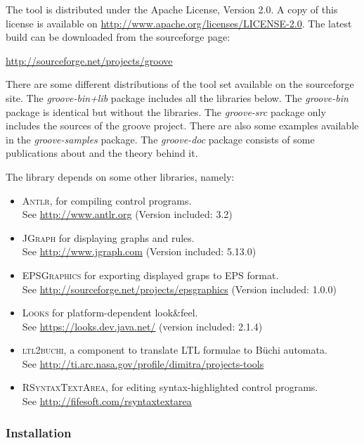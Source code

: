 The \GROOVE tool is distributed under the Apache License, Version 2.0. A copy of
this license is available on \url{http://www.apache.org/licenses/LICENSE-2.0}.
The latest \GROOVE build can be downloaded from the \GROOVE sourceforge page:

\begin{center}
\url{http://sourceforge.net/projects/groove}
\end{center}

There are some different distributions of the \GROOVE tool set available on the
sourceforge site. The \emph{groove-bin+lib} package includes all the libraries
below. The \emph{groove-bin} package is identical but without the libraries.
The \emph{groove-src} package only includes the sources of the groove project.
There are also some examples available in the \emph{groove-samples} package.
The \emph{groove-doc} package consists of some publications about \GROOVE and
the theory behind it.


The \GROOVE library depends on some other libraries, namely:

\begin{itemize}\noitemsep
\item \textsc{Antlr}, for compiling control programs. \\
  See \url{http://www.antlr.org} (Version included: 3.2)
\item \textsc{JGraph} for displaying graphs and rules. \\
  See \url{http://www.jgraph.com} (Version included: 5.13.0)
\item \textsc{EPSGraphics} for exporting displayed graps to EPS format. \\
  See \url{http://sourceforge.net/projects/epsgraphics} (Version included: 1.0.0)
\item \textsc{Looks} for platform-dependent look\&feel. \\
  See \url{https://looks.dev.java.net/} (version included: 2.1.4)
\item \textsc{ltl2buchi}, a component to translate LTL formulae to
  B\"uchi automata. \\ See \url{http://ti.arc.nasa.gov/profile/dimitra/projects-tools}
\item \textsc{RSyntaxTextArea}, for editing syntax-highlighted control
  programs. \\ See \url{http://fifesoft.com/rsyntaxtextarea}
\end{itemize}

\subsubsection{Installation}

